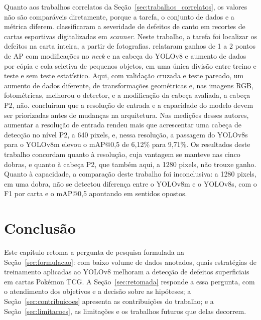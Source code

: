 \documentclass[
    12pt,                %
    openright,           %
    oneside,             %
    a4paper,             %
    english,             %
    brazil               %
]{abntex2}
\begin{document}
Quanto aos trabalhos correlatos da Seção~\ref{sec:trabalhos_correlatos},
os valores não são comparáveis diretamente, porque a tarefa, o conjunto
de dados e a métrica diferem.  classificaram a
severidade de defeitos de canto em recortes de cartas esportivas
digitalizadas em \textit{scanner}. Neste trabalho, a tarefa foi localizar
os defeitos na carta inteira, a partir de fotografias.
 relataram ganhos de 1 a 2 pontos de AP com
modificações no \textit{neck} e na cabeça do YOLOv8 e aumento de dados
por cópia e cola seletiva de pequenos objetos, em uma única divisão
entre treino e teste e sem teste estatístico. Aqui, com validação
cruzada e teste pareado, um aumento de dados diferente, de
transformações geométricas e, nas imagens RGB, fotométricas, melhorou o
detector, e a
modificação da cabeça avaliada, a cabeça P2, não.
 concluíram que a resolução de entrada e a
capacidade do modelo devem ser priorizadas antes de mudanças na
arquitetura. Nas medições desses autores, aumentar a resolução de entrada rendeu mais que acrescentar uma cabeça de detecção no nível P2, a 640 pixels, e, nessa resolução, a passagem do YOLOv8s para o YOLOv8m elevou o mAP@0,5 de 6,12\% para 9,71\%.
Os resultados deste trabalho concordam quanto à resolução, cuja
vantagem se manteve nas cinco dobras, e quanto à cabeça P2, que também
aqui, a 1280 pixels, não trouxe ganho. Quanto à capacidade, a
comparação deste trabalho foi inconclusiva: a 1280 pixels, em uma dobra,
não se detectou diferença entre o YOLOv8m e o YOLOv8s, com o F1 por
carta e o mAP@0,5 apontando em sentidos opostos.

\chapter{Conclusão}
\label{cap:conclusao}

Este capítulo retoma a pergunta de pesquisa formulada na
Seção~\ref{sec:formulacao}: com baixo volume de dados
anotados, quais estratégias de treinamento aplicadas ao YOLOv8 melhoram
a detecção de defeitos superficiais em cartas Pokémon TCG. A
Seção~\ref{sec:retomada} responde a essa pergunta, com o atendimento
dos objetivos e a decisão sobre as hipóteses; a
Seção~\ref{sec:contribuicoes} apresenta as contribuições do trabalho; e
a Seção~\ref{sec:limitacoes}, as limitações e os trabalhos futuros que
delas decorrem.
\end{document}
